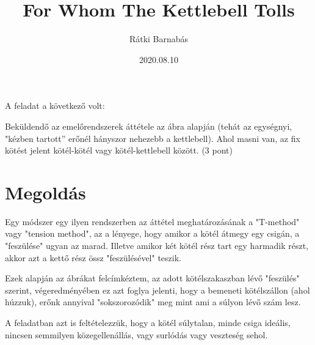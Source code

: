 \documentclass{article}[12pt,a4paper]
\title{For Whom The Kettlebell Tolls}
\author{Rátki Barnabás}
\date{2020.08.10}
\begin{document}
\maketitle

A feladat a következő volt: \begin{displayquote}
Beküldendő az emelőrendszerek áttétele az ábra alapján (tehát az egységnyi, "kézben tartott” erőnél hányszor nehezebb a kettlebell). Ahol masni van, az fix kötést jelent kötél-kötél vagy kötél-kettlebell között. (3 pont)
\end{displayquote}

\section{Megoldás}
Egy módszer egy ilyen rendszerben az áttétel meghatározásának a "T-method" vagy "tension method", az a lényege, hogy amikor a kötél átmegy egy csigán, a "feszülése" ugyan az marad. Illetve amikor két kötél rész tart egy harmadik részt, akkor azt a kettő rész össz "feszülésével" teszik.

Ezek alapján az ábrákat felcímkéztem, az adott kötélszakaszban lévő "feszülés" szerint, végeredményében ez azt foglya jelenti, hogy a bemeneti kötélszállon (ahol húzzuk), erőnk annyival "sokszorozódik" meg mint ami a súlyon lévő szám lesz.

A feladatban azt is feltételezzük, hogy a kötél súlytalan, minde csiga ideális, nincsen semmilyen közegellenállás, vagy surlódás vagy veszteség sehol.
\end{document}
